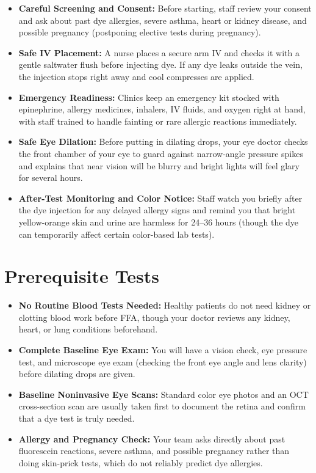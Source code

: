 \begin{itemize}
    \item \textbf{Careful Screening and Consent:} Before starting, staff review your consent and ask about past dye allergies, severe asthma, heart or kidney disease, and possible pregnancy (postponing elective tests during pregnancy).
    \item \textbf{Safe IV Placement:} A nurse places a secure arm IV and checks it with a gentle saltwater flush before injecting dye. If any dye leaks outside the vein, the injection stops right away and cool compresses are applied.
    \item \textbf{Emergency Readiness:} Clinics keep an emergency kit stocked with epinephrine, allergy medicines, inhalers, IV fluids, and oxygen right at hand, with staff trained to handle fainting or rare allergic reactions immediately.
    \item \textbf{Safe Eye Dilation:} Before putting in dilating drops, your eye doctor checks the front chamber of your eye to guard against narrow-angle pressure spikes and explains that near vision will be blurry and bright lights will feel glary for several hours.
    \item \textbf{After-Test Monitoring and Color Notice:} Staff watch you briefly after the dye injection for any delayed allergy signs and remind you that bright yellow-orange skin and urine are harmless for 24--36 hours (though the dye can temporarily affect certain color-based lab tests).
\end{itemize}

\section{Prerequisite Tests}

\begin{itemize}
    \item \textbf{No Routine Blood Tests Needed:} Healthy patients do not need kidney or clotting blood work before FFA, though your doctor reviews any kidney, heart, or lung conditions beforehand.
    \item \textbf{Complete Baseline Eye Exam:} You will have a vision check, eye pressure test, and microscope eye exam (checking the front eye angle and lens clarity) before dilating drops are given.
    \item \textbf{Baseline Noninvasive Eye Scans:} Standard color eye photos and an OCT cross-section scan are usually taken first to document the retina and confirm that a dye test is truly needed.
    \item \textbf{Allergy and Pregnancy Check:} Your team asks directly about past fluorescein reactions, severe asthma, and possible pregnancy rather than doing skin-prick tests, which do not reliably predict dye allergies.
\end{itemize}

